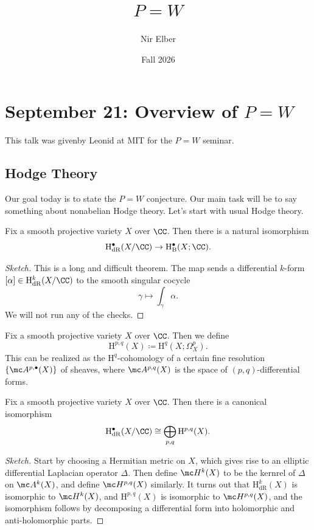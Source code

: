 \documentclass{article}
\title{\texorpdfstring{$P=W$}{P=W}}
\author{Nir Elber}
\date{Fall 2026}
\begin{document}
\maketitle

\tableofcontents

\section{September 21: Overview of \texorpdfstring{$P=W$}{ P=W}}
This talk was givenby Leonid at MIT for the $P=W$ seminar.

\subsection{Hodge Theory}
Our goal today is to state the $P=W$ conjecture. Our main task will be to say something about nonabelian Hodge theory. Let's start with usual Hodge theory.
\begin{theorem}[de Rham]
	Fix a smooth projective variety $X$ over $\CC$. Then there is a natural isomorphism
	\[\mathrm H^\bullet_{\mathrm{dR}}(X/\CC)\to\mathrm H^\bullet_{\mathrm{B}}(X;\CC).\]
\end{theorem}
\begin{proof}[Sketch]
	This is a long and difficult theorem. The map sends a differential $k$-form $[\alpha]\in\mathrm H^k_{\mathrm{dR}}(X/\CC)$ to the smooth singular cocycle
	\[\gamma\mapsto\int_\gamma\alpha.\]
	We will not run any of the checks.
\end{proof}
\begin{notation}
	Fix a smooth projective variety $X$ over $\CC$. Then we define
	\[\mathrm H^{p,q}(X)\coloneqq\mathrm H^q(X;\Omega^p_X).\]
	This can be realized as the $\mathrm H^q$-cohomology of a certain fine resolution $\left\{\mc A^{p,\bullet}(X)\right\}$ of sheaves, where $\mc A^{p,q}(X)$ is the space of $(p,q)$-differential forms.
\end{notation}
\begin{theorem}
	Fix a smooth projective variety $X$ over $\CC$. Then there is a canonical isomorphism
	\[\mathrm H^\bullet_{\mathrm{dR}}(X/\CC)\cong\bigoplus_{p,q}\mathrm H^{p,q}(X).\]
\end{theorem}
\begin{proof}[Sketch]
	Start by choosing a Hermitian metric on $X$, which gives rise to an elliptic differential Laplacian operator $\Delta$. Then define $\mc H^k(X)$ to be the kernrel of $\Delta$ on $\mc A^k(X)$, and define $\mc H^{p,q}(X)$ similarly. It turns out that $\mathrm H^k_{\mathrm{dR}}(X)$ is isomorphic to $\mc H^k(X)$, and $\mathrm H^{p,q}(X)$ is isomorphic to $\mc H^{p,q}(X)$, and the isomorphism follows by decomposing a differential form into holomorphic and anti-holomorphic parts.
\end{proof}
\end{document}
